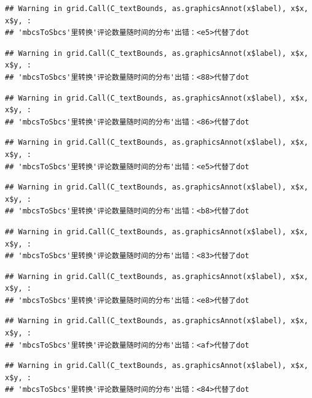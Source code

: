 \documentclass[
]{article}
\begin{document}
\begin{verbatim}
## Warning in grid.Call(C_textBounds, as.graphicsAnnot(x$label), x$x, x$y, :
## 'mbcsToSbcs'里转换'评论数量随时间的分布'出错：<e5>代替了dot
\end{verbatim}

\begin{verbatim}
## Warning in grid.Call(C_textBounds, as.graphicsAnnot(x$label), x$x, x$y, :
## 'mbcsToSbcs'里转换'评论数量随时间的分布'出错：<88>代替了dot
\end{verbatim}

\begin{verbatim}
## Warning in grid.Call(C_textBounds, as.graphicsAnnot(x$label), x$x, x$y, :
## 'mbcsToSbcs'里转换'评论数量随时间的分布'出错：<86>代替了dot
\end{verbatim}

\begin{verbatim}
## Warning in grid.Call(C_textBounds, as.graphicsAnnot(x$label), x$x, x$y, :
## 'mbcsToSbcs'里转换'评论数量随时间的分布'出错：<e5>代替了dot
\end{verbatim}

\begin{verbatim}
## Warning in grid.Call(C_textBounds, as.graphicsAnnot(x$label), x$x, x$y, :
## 'mbcsToSbcs'里转换'评论数量随时间的分布'出错：<b8>代替了dot
\end{verbatim}

\begin{verbatim}
## Warning in grid.Call(C_textBounds, as.graphicsAnnot(x$label), x$x, x$y, :
## 'mbcsToSbcs'里转换'评论数量随时间的分布'出错：<83>代替了dot
\end{verbatim}

\begin{verbatim}
## Warning in grid.Call(C_textBounds, as.graphicsAnnot(x$label), x$x, x$y, :
## 'mbcsToSbcs'里转换'评论数量随时间的分布'出错：<e8>代替了dot
\end{verbatim}

\begin{verbatim}
## Warning in grid.Call(C_textBounds, as.graphicsAnnot(x$label), x$x, x$y, :
## 'mbcsToSbcs'里转换'评论数量随时间的分布'出错：<af>代替了dot
\end{verbatim}

\begin{verbatim}
## Warning in grid.Call(C_textBounds, as.graphicsAnnot(x$label), x$x, x$y, :
## 'mbcsToSbcs'里转换'评论数量随时间的分布'出错：<84>代替了dot
\end{verbatim}
\end{document}
